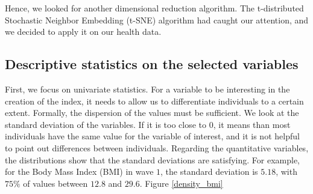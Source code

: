 \documentclass[]{article}
\begin{document}
\noindent
Hence, we looked for another dimensional reduction algorithm. The t-distributed Stochastic Neighbor Embedding (t-SNE) algorithm \cite{tSNE2008} had caught our attention, and we decided to apply it on our health data.

\subsection{Descriptive statistics on the selected variables}
First, we focus on univariate statistics. For a variable to be interesting in the creation of the index, it needs to allow us to differentiate individuals to a certain extent. Formally, the dispersion of the values must be sufficient. We look at the standard deviation of the variables. If it is too close to $0$, it means than most individuals have the same value for the variable of interest, and it is not helpful to point out differences between individuals. Regarding the quantitative variables, the distributions show that the standard deviations are satisfying. For example, for the Body Mass Index (BMI) in wave $1$, the standard deviation is $5.18$, with $75\%$ of values between $12.8$ and $29.6$. Figure \ref{density_bmi}
\end{document}
